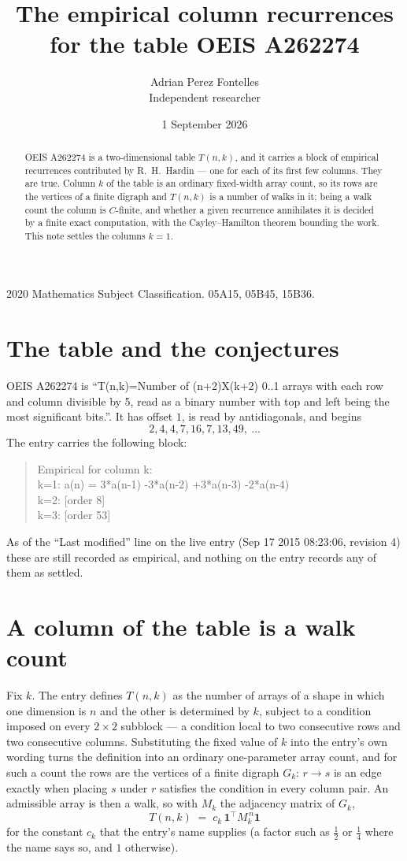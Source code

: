\documentclass[11pt,a4paper]{article}
\title{The empirical column recurrences for the table OEIS A262274}
\author{Adrian Perez Fontelles\\ \small Independent researcher}
\date{1 September 2026}
\theoremstyle{plain}
\theoremstyle{definition}
\begin{document}
\maketitle

\begin{abstract}
OEIS A262274 is a two-dimensional table $T(n,k)$, and it carries a block of empirical
recurrences contributed by R.~H.~Hardin --- one for each of its first few columns. They are
true. Column $k$ of the table is an ordinary fixed-width array count, so its rows are the
vertices of a finite digraph and $T(n,k)$ is a number of walks in it; being a walk count the
column is $C$-finite, and whether a given recurrence annihilates it is decided by a finite
exact computation, with the Cayley--Hamilton theorem bounding the work. This note settles the columns $k=1$.
\end{abstract}

\noindent\small 2020 Mathematics Subject Classification. 05A15, 05B45, 15B36.\normalsize

\section{The table and the conjectures}

OEIS A262274 is ``T(n,k)=Number of (n+2)X(k+2) 0..1 arrays with each row and column divisible by 5, read as a binary number with top and left being the most significant bits.''. It has offset $1$, is
read by antidiagonals, and begins
\[
2, 4, 4, 7, 16, 7, 13, 49,\ \dots
\]
The entry carries the following block:
\begin{quote}\small
Empirical for column k:\\
k=1: a(n) = 3*a(n-1) -3*a(n-2) +3*a(n-3) -2*a(n-4)\\
k=2: [order 8]\\
k=3: [order 53]\\
\end{quote}
As of the ``Last modified'' line on the live entry (Sep 17 2015 08:23:06, revision 4) these are still
recorded as empirical, and nothing on the entry records any of them as settled.

\section{A column of the table is a walk count}

Fix $k$. The entry defines $T(n,k)$ as the number of arrays of a shape in which one dimension
is $n$ and the other is determined by $k$, subject to a condition imposed on every
$2\times2$ subblock --- a condition local to two consecutive rows and two consecutive columns.
Substituting the fixed value of $k$ into the entry's own wording turns the definition into an
ordinary one-parameter array count, and for such a count the rows are the vertices of a finite
digraph $G_k$: $r\to s$ is an edge exactly when placing $s$ under $r$ satisfies the condition
in every column pair. An admissible array is then a walk, so with $M_k$ the adjacency matrix
of $G_k$,
\[
T(n,k)\;=\;c_k\,\mathbf{1}^{\!\top}M_k^{\,n}\mathbf{1}
\]
for the constant $c_k$ that the entry's name supplies (a factor such as $\tfrac12$ or
$\tfrac14$ where the name says so, and $1$ otherwise).
\end{document}
